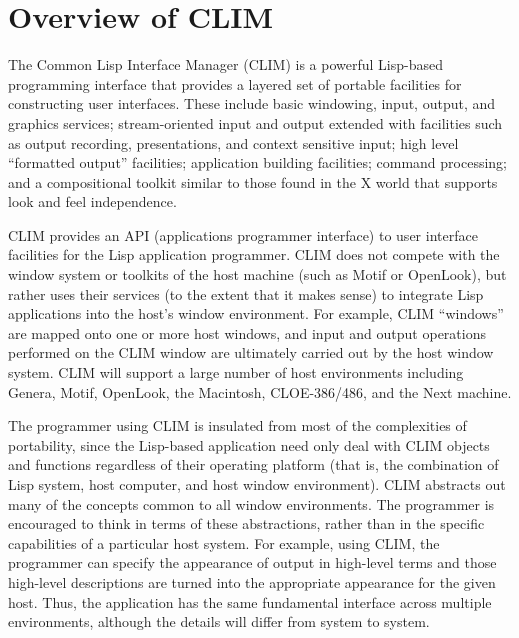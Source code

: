 
\chapter {Overview of CLIM}
\label {clim-overview}

The Common Lisp Interface Manager (CLIM) is a powerful Lisp-based programming
interface that provides a layered set of portable facilities for constructing
user interfaces.  These include basic windowing, input, output, and graphics
services; stream-oriented input and output extended with facilities such as
output recording, presentations, and context sensitive input; high level
``formatted output'' facilities; application building facilities; command
processing; and a compositional toolkit similar to those found in the X world
that supports look and feel independence.

CLIM provides an API (applications programmer interface) to user interface
facilities for the Lisp application programmer.  CLIM does not compete with the
window system or toolkits of the host machine (such as Motif or OpenLook), but
rather uses their services (to the extent that it makes sense) to integrate Lisp
applications into the host's window environment.  For example, CLIM ``windows''
are mapped onto one or more host windows, and input and output operations
performed on the CLIM window are ultimately carried out by the host window
system.  CLIM will support a large number of host environments including Genera,
Motif, OpenLook, the Macintosh, CLOE-386/486, and the Next machine.

The programmer using CLIM is insulated from most of the complexities of
portability, since the Lisp-based application need only deal with CLIM objects
and functions regardless of their operating platform (that is, the combination
of Lisp system, host computer, and host window environment).  CLIM abstracts out
many of the concepts common to all window environments.  The programmer is
encouraged to think in terms of these abstractions, rather than in the specific
capabilities of a particular host system.  For example, using CLIM, the
programmer can specify the appearance of output in high-level terms and those
high-level descriptions are turned into the appropriate appearance for the given
host.  Thus, the application has the same fundamental interface across multiple
environments, although the details will differ from system to system.

